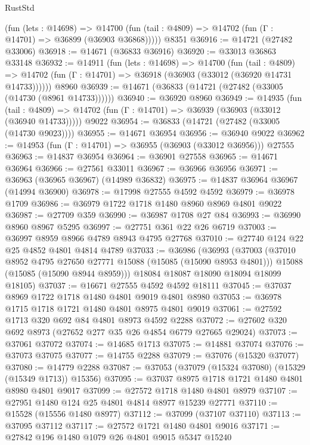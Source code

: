 \begin{lexlean}{RustStd}
\begin{coremodule}
      (fun (lets : @14698) =>
      @14700 (fun (tail : @4809) => @14702 (fun (Γ : @14701) => @36899 (@36903 @36868)))))
    @8351
@36916 := @14721 (@27482 @33006)
@36918 := @14671 (@36833 @36916)
@36920 := @33013 @36863 @33148
@36932 := @14911
    (fun (lets : @14698) =>
    @14700
      (fun (tail : @4809) =>
      @14702 (fun (Γ : @14701) => @36918 (@36903 (@33012 (@36920 @14731 @14733))))))
    @8960
@36939 := @14671 (@36833 (@14721 (@27482 (@33005 (@14730 (@8961 @14733))))))
@36940 := @36920 @8960
@36949 := @14935
    (fun (tail : @4809) => @14702 (fun (Γ : @14701) => @36939 (@36903 (@33012 (@36940 @14733)))))
    @9022
@36954 := @36833 (@14721 (@27482 (@33005 (@14730 @9023))))
@36955 := @14671 @36954
@36956 := @36940 @9022
@36962 := @14953 (fun (Γ : @14701) => @36955 (@36903 (@33012 @36956))) @27555
@36963 := @14837 @36954
@36964 := @36901 @27558
@36965 := @14671 @36964
@36966 := @27561 @33011
@36967 := @36966 @36956
@36971 := @36963 (@36965 @36967) (@14989 @36832)
@36975 := @14837 @36964 @36967 (@14994 @36900)
@36978 := @17998 @27555 @4592 @4592
@36979 := @36978 @1709
@36986 := @36979 @1722 @1718 @1480 @8960 @8969 @4801 @9022
@36987 := @27709 @359
@36990 := @36987 @1708 @27 @84
@36993 := @36990 @8960 @8967 @5295
@36997 := @27751 @361 @22 @26 @6719
@37003 := @36997 @8959 @8966 @4789 @8943 @4795 @27768
@37010 := @27740 @124 @22 @25 @4852 @4801 @4814 @4789
@37033 := @36986
    (@36993
      (@37003
        (@37010 @8952 @4795 @27650 @27771 @15088 (@15085 (@15090 @8953 @4801)))
        @15088
        (@15085 (@15090 @8944 @8959)))
      @18084
      @18087
      @18090
      @18094
      @18099
      @18105)
@37037 := @16671 @27555 @4592 @4592 @18111
@37045 := @37037 @8969 @1722 @1718 @1480 @4801 @9019 @4801 @8980
@37053 := @36978 @1715 @1718 @1721 @1480 @4801 @8975 @4801 @9019
@37061 := @27592 @1713 @320 @692 @84 @4801 @8973 @4592 @2288
@37072 := @27602 @320 @692 @8973 (@27652 @277 @35 @26 @4854 @6779 @27665 @29024)
@37073 := @37061 @37072
@37074 := @14685 @1713
@37075 := @14881 @37074
@37076 := @37073 @37075
@37077 := @14755 @2288
@37079 := @37076 (@15320 @37077)
@37080 := @14779 @2288
@37087 := @37053 (@37079 (@15324 @37080) (@15329 (@15349 @1713)) @15356)
@37095 := @37037 @8975 @1718 @1721 @1480 @4801 @8980 @4801 @9017
@37099 := @27572 @1718 @1480 @4801 @8979
@37107 := @27951 @1480 @124 @25 @4801 @4814 @8977 @15239 @27771
@37110 := @15528 (@15556 @1480 @8977)
@37112 := @37099 (@37107 @37110)
@37113 := @37095 @37112
@37117 := @27572 @1721 @1480 @4801 @9016
@37171 := @27842
    @196
    @1480
    @1079
    @26
    @4801
    @9015
    @5347
    @15240

\end{coremodule}
\end{lexlean}
